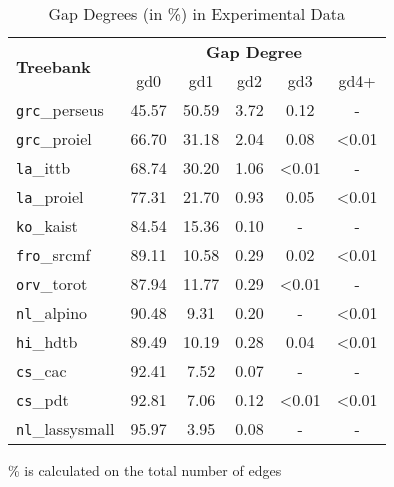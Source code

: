 \begin{table}[H]
    \centering
    \begin{tabular}{|l|c|c|c|c|c|}
    \hline
    \multirow{2}{*}{\textbf{Treebank}} &
    \multicolumn{5}{c|}{\textbf{Gap Degree}} \\
    & gd0 & gd1 & gd2 & gd3 & gd4+\\
    \hline
    \hline
    \texttt{grc}\_perseus & 45.57 & 50.59 & 3.72 & 0.12 & - \\
    \texttt{grc}\_proiel & 66.70 & 31.18 & 2.04 & 0.08 & <0.01\\
    \texttt{la}\_ittb & 68.74 & 30.20 & 1.06 & <0.01 & - \\
    \texttt{la}\_proiel & 77.31 & 21.70 & 0.93 & 0.05 & <0.01 \\
    \texttt{ko}\_kaist & 84.54 & 15.36 & 0.10 & - & - \\
    \texttt{fro}\_srcmf & 89.11 & 10.58 & 0.29 & 0.02 & <0.01 \\
    \texttt{orv}\_torot & 87.94 & 11.77 & 0.29 & <0.01 & - \\
    \texttt{nl}\_alpino & 90.48 & 9.31 & 0.20 & - & <0.01 \\
    \texttt{hi}\_hdtb & 89.49 & 10.19 & 0.28 & 0.04 & <0.01 \\
    \texttt{cs}\_cac & 92.41 & 7.52 & 0.07 & - & - \\
    \hline
    \texttt{cs}\_pdt & 92.81 & 7.06 & 0.12 & <0.01 & <0.01 \\
    \texttt{nl}\_lassysmall & 95.97 & 3.95 & 0.08 & - & - \\
    \hline
    \end{tabular}
    \caption{Gap Degrees (in \%) in Experimental Data}\% is calculated on the total number of edges
    \label{tab:gap_degrees}
\end{table}

